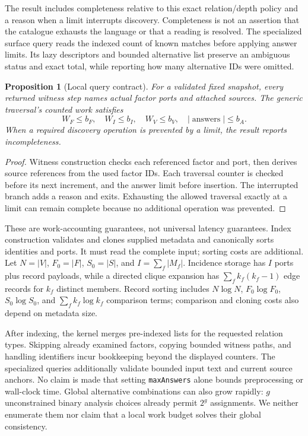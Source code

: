 \documentclass{article}
\newtheorem{proposition}{Proposition}
\begin{document}
The result includes completeness relative to this exact relation/depth policy and a reason when a limit interrupts discovery. Completeness is not an assertion that the catalogue exhausts the language or that a reading is resolved. The specialized surface query reads the indexed count of known matches before applying answer limits. Its lazy descriptors and bounded alternative list preserve an ambiguous status and exact total, while reporting how many alternative IDs were omitted.

\begin{proposition}[Local query contract]
For a validated fixed snapshot, every returned witness step names actual factor ports and attached sources. The generic traversal's counted work satisfies
\begin{equation}
 W_F\le b_F,\quad W_I\le b_I,\quad W_V\le b_V,
 \quad |\operatorname{answers}|\le b_A.
\end{equation}
When a required discovery operation is prevented by a limit, the result reports incompleteness.
\end{proposition}
\begin{proof}
Witness construction checks each referenced factor and port, then derives source references from the used factor IDs. Each traversal counter is checked before its next increment, and the answer limit before insertion. The interrupted branch adds a reason and exits. Exhausting the allowed traversal exactly at a limit can remain complete because no additional operation was prevented.
\end{proof}

These are work-accounting guarantees, not universal latency guarantees. Index construction validates and clones supplied metadata and canonically sorts identities and ports. It must read the complete input; sorting costs are additional. Let $N=|V|$, $F_0=|F|$, $S_0=|S|$, and $I=\sum_f|M_f|$. Incidence storage has $I$ ports plus record payloads, while a directed clique expansion has $\sum_f k_f(k_f-1)$ edge records for $k_f$ distinct members. Record sorting includes $N\log N$, $F_0\log F_0$, $S_0\log S_0$, and $\sum_f k_f\log k_f$ comparison terms; comparison and cloning costs also depend on metadata size.

After indexing, the kernel merges pre-indexed lists for the requested relation types. Skipping already examined factors, copying bounded witness paths, and handling identifiers incur bookkeeping beyond the displayed counters. The specialized queries additionally validate bounded input text and current source anchors. No claim is made that setting \texttt{maxAnswers} alone bounds preprocessing or wall-clock time. Global alternative combinations can also grow rapidly: $g$ unconstrained binary analysis choices already permit $2^g$ assignments. We neither enumerate them nor claim that a local work budget solves their global consistency.
\end{document}
